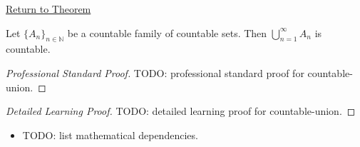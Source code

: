 \newpage
{}
\label{prf:countable-union}

\begin{remark*}[Return]
\hyperref[thm:countable-union]{Return to Theorem}
\end{remark*}

\begin{theorem*}
Let $\{A_n\}_{n \in \mathbb{N}}$ be a countable family of countable sets.
Then $\bigcup_{n=1}^{\infty} A_n$ is countable.
\end{theorem*}

\begin{proof}[Professional Standard Proof]
\LRAProofBodyStart
TODO: professional standard proof for countable-union.
\end{proof}

\begin{proof}[Detailed Learning Proof]
\LRAProofBodyStart
TODO: detailed learning proof for countable-union.
\end{proof}

\begin{remark*}
\end{remark*}

\begin{dependencies}
\begin{itemize}
  \item TODO: list mathematical dependencies.
\end{itemize}
\end{dependencies}

\clearpage
